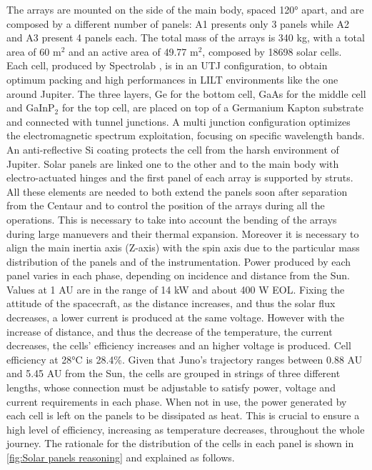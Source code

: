 The arrays are mounted on the side of the main body, spaced 120° apart, and are composed by a different number of panels: A1 presents only 3 panels while A2 and A3 present 4 panels each. The total mass of the arrays is 340 kg, with a total area of 60 m$^2$ \cite{arrays_mass} and an active area of 49.77 m$^2$, composed by 18698 solar cells.\cite{masses_ref} 
Each cell, produced by Spectrolab \cite{solar_datasheet}, is in an UTJ configuration, to obtain optimum packing and high performances in LILT environments like the one around Jupiter. The three layers, Ge for the bottom cell, GaAs for the middle cell and GaInP$_2$ for the top cell, are placed on top of a Germanium Kapton substrate and connected with tunnel junctions. A multi junction configuration optimizes the electromagnetic spectrum exploitation, focusing on specific wavelength bands. An anti-reflective Si coating protects the cell from the harsh environment of Jupiter. Solar panels are linked one to the other and to the main body with electro-actuated hinges and the first panel of each array is supported by struts. All these elements are needed to both extend the panels soon after separation from the Centaur and to control the position of the arrays during all the operations. This is necessary to take into account the bending of the arrays during large manuevers and their thermal expansion. Moreover it is necessary to align the main inertia axis (Z-axis) with the spin axis due to the particular mass distribution of the panels and of the instrumentation. Power produced by each panel varies in each phase, depending on incidence and distance from the Sun. Values at 1 AU are in the range of 14 kW and about 400 W EOL. Fixing the attitude of the spacecraft, as the distance increases, and thus the solar flux decreases, a lower current is produced at the same voltage. However with the increase of distance, and thus the decrease of the temperature, the current decreases, the cells' efficiency increases and an higher voltage is produced. Cell efficiency at 28°C is 28.4\%.  Given that Juno's trajectory ranges between 0.88 AU and 5.45 AU from the Sun, the cells are grouped in strings of three different lengths, whose connection must be adjustable to satisfy power, voltage and current requirements in each phase. When not in use, the power generated by each cell is left on the panels to be dissipated as heat.\cite{solar_panels_coef} This is crucial to ensure a high level of efficiency, increasing as temperature decreases, throughout the whole journey. The rationale for the distribution of the cells in each panel is shown in \autoref{fig:Solar panels reasoning} and explained as follows. 
